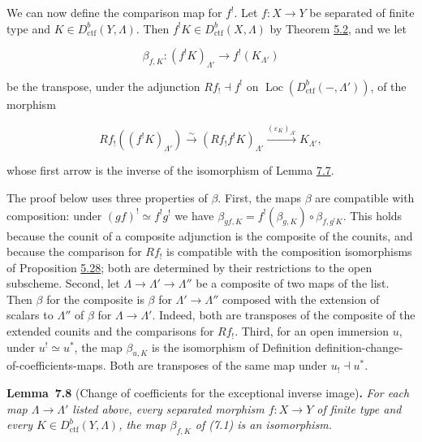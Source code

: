\documentclass[11pt]{article}
\newenvironment{bpstatement}[2]{\par\addvspace{0.6\baselineskip}\noindent\textbf{#1}#2\textbf{.}\enspace\ignorespaces}
  {\par\addvspace{0.4\baselineskip}}
\newenvironment{bpstatementit}[2]{\begin{bpstatement}{#1}{#2}\itshape\ignorespaces}{\end{bpstatement}}
\providecommand{\Loc}{}\renewcommand{\Loc}{\operatorname{Loc}}
\begin{document}
\label{bp620}%
We can now define the comparison map for \(f^!\). Let \(f:X\to Y\) be separated of finite type and \(K\in D^b_{\mathrm{ctf}}(Y,\Lambda)\). Then \(f^!K\in D^b_{\mathrm{ctf}}(X,\Lambda)\) by Theorem \hyperref[bp413]{5.2}, and we let

\[
\beta_{f,K}:(f^!K)_{\Lambda'}\longrightarrow f^!(K_{\Lambda'})
\tag{7.1}
\]

be the transpose, under the adjunction \(Rf_!\dashv f^!\) on \(\Loc(D^b_{\mathrm{ctf}}(-,\Lambda'))\), of the morphism

\[
Rf_!((f^!K)_{\Lambda'})
\xrightarrow{\sim}(Rf_!f^!K)_{\Lambda'}
\xrightarrow{(\varepsilon_K)_{\Lambda'}}K_{\Lambda'},
\]

whose first arrow is the inverse of the isomorphism of Lemma \hyperref[bp618]{7.7}.

The proof below uses three properties of \(\beta\). First, the maps \(\beta\) are compatible with composition: under \((gf)^!\simeq f^!g^!\) we have \(\beta_{gf,K}=f^!(\beta_{g,K})\circ\beta_{f,g^!K}\). This holds because the counit of a composite adjunction is the composite of the counits, and because the comparison for \(Rf_!\) is compatible with the composition isomorphisms of Proposition \hyperref[bp496]{5.28}; both are determined by their restrictions to the open subscheme. Second, let \(\Lambda\to\Lambda'\to\Lambda''\) be a composite of two maps of the list. Then \(\beta\) for the composite is \(\beta\) for \(\Lambda'\to\Lambda''\) composed with the extension of scalars to \(\Lambda''\) of \(\beta\) for \(\Lambda\to\Lambda'\). Indeed, both are transposes of the composite of the extended counits and the comparisons for \(Rf_!\). Third, for an open immersion \(u\), under \(u^!\simeq u^*\), the map \(\beta_{u,K}\) is the isomorphism of Definition definition-change-of-coefficients-maps. Both are transposes of the same map under \(u_!\dashv u^*\).

\label{bp621}%
\begin{bpstatementit}{Lemma~7.8}{ (Change of coefficients for the exceptional inverse image)}
For each map \(\Lambda\to\Lambda'\) listed above, every separated morphism \(f:X\to Y\) of finite type and every \(K\in D^b_{\mathrm{ctf}}(Y,\Lambda)\), the map \(\beta_{f,K}\) of (7.1) is an isomorphism.
\end{bpstatementit}
\end{document}
